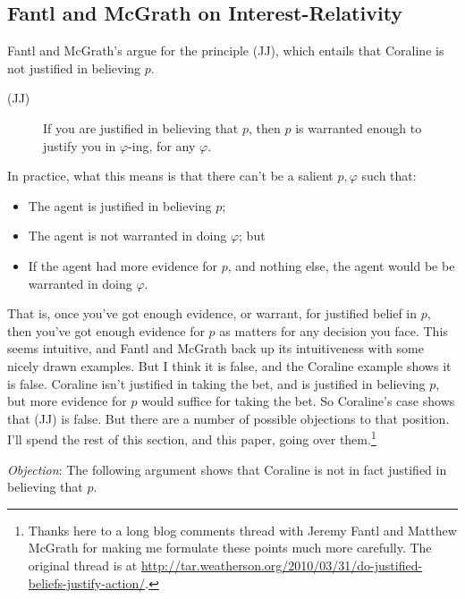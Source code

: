 \subsection{Fantl and McGrath on Interest-Relativity}

Fantl and McGrath's argue for the principle (JJ), which entails that Coraline is not justified in believing $p$.

\begin{description}
\item[(JJ)] If you are justified in believing that $p$, then $p$ is warranted enough to justify you in $\varphi$-ing, for any $\varphi$. \cite[99]{FantlMcGrath2009}
\end{description}

\noindent In practice, what this means is that there can't be a salient $p, \varphi$ such that:

\begin{itemize}
\item The agent is justified in believing $p$;
\item The agent is not warranted in doing $\varphi$; but
\item If the agent had more evidence for $p$, and nothing else, the agent would be be warranted in doing $\varphi$.
\end{itemize}

\noindent That is, once you've got enough evidence, or warrant, for justified belief in $p$, then you've got enough evidence for $p$ as matters for any decision you face. This seems intuitive, and Fantl and McGrath back up its intuitiveness with some nicely drawn examples. But I think it is false, and the Coraline example shows it is false. Coraline isn't justified in taking the bet, and is justified in believing $p$, but more evidence for $p$ would suffice for taking the bet. So Coraline's case shows that (JJ) is false. But there are a number of possible objections to that position. I'll spend the rest of this section, and this paper, going over them.\footnote{Thanks here to a long blog comments thread with Jeremy Fantl and Matthew McGrath for making me formulate these points much more carefully. The original thread is at \url{http://tar.weatherson.org/2010/03/31/do-justified-beliefs-justify-action/}.}


\textit{Objection}: The following argument shows that Coraline is not in fact justified in believing that $p$.

